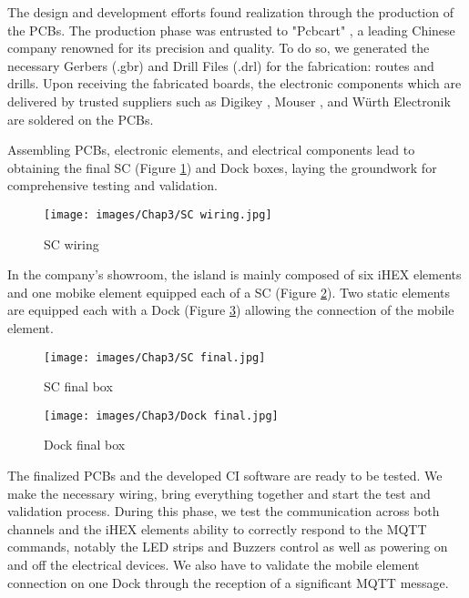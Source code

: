 The design and development efforts found realization through the production of the PCBs. The production phase was entrusted to "Pcbcart" \cite{R32}, a leading Chinese company renowned for its precision and quality. To do so, we generated the necessary Gerbers (.gbr) and Drill Files (.drl) for the fabrication: routes and drills.  Upon receiving the fabricated boards, the electronic components which are delivered by trusted suppliers such as Digikey \cite{R33}, Mouser \cite{R34}, and Würth Electronik \cite{R35} are soldered on the PCBs.

Assembling PCBs, electronic elements, and electrical components lead to obtaining the final SC (Figure \ref{SC wiring}) and Dock boxes, laying the groundwork for comprehensive testing and validation. 

\begin{figure}[H]
\begin{center}
\texttt{[image: images/Chap3/SC wiring.jpg]}\\
\caption{SC wiring}
\label{SC wiring}
\end{center}
\end{figure}

In the company's showroom, the island is mainly composed of six iHEX elements and one mobike element equipped each of a SC (Figure \ref{SC final}). Two static elements are equipped each with a Dock (Figure \ref{Dock final}) allowing the connection of the mobile element.

\begin{figure}[H]
\begin{center}
\texttt{[image: images/Chap3/SC final.jpg]}\\
\caption{SC final box}
\label{SC final}
\end{center}
\end{figure}

\begin{figure}[H]
\begin{center}
\texttt{[image: images/Chap3/Dock final.jpg]}\\
\caption{Dock final box}
\label{Dock final}
\end{center}
\end{figure}

The finalized PCBs and the developed CI software are ready to be tested. We make the necessary wiring, bring everything together and start the test and validation process. During this phase, we test the communication across both channels and the iHEX elements ability to correctly respond to the MQTT commands, notably the LED strips and Buzzers control as well as powering on and off the electrical devices. We also have to validate the mobile element connection on one Dock through the reception of a significant MQTT message.
 
